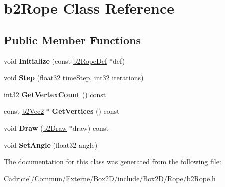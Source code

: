 \hypertarget{classb2_rope}{}\section{b2\+Rope Class Reference}
\label{classb2_rope}
\subsection*{Public Member Functions}
\begin{DoxyCompactItemize}
\item 
void {\bfseries Initialize} (const \hyperlink{structb2_rope_def}{b2\+Rope\+Def} $\ast$def)\hypertarget{classb2_rope_a2a672ca3310790f4af1beb123e597d70}{}\label{classb2_rope_a2a672ca3310790f4af1beb123e597d70}

\item 
void {\bfseries Step} (float32 time\+Step, int32 iterations)\hypertarget{classb2_rope_abe9ce398cef717b136645cbc37f38d70}{}\label{classb2_rope_abe9ce398cef717b136645cbc37f38d70}

\item 
int32 {\bfseries Get\+Vertex\+Count} () const \hypertarget{classb2_rope_aa002b5f7efd152770803aade884f2c75}{}\label{classb2_rope_aa002b5f7efd152770803aade884f2c75}

\item 
const \hyperlink{structb2_vec2}{b2\+Vec2} $\ast$ {\bfseries Get\+Vertices} () const \hypertarget{classb2_rope_a9f5c76a25e44baa702d2a6beef9f2f9c}{}\label{classb2_rope_a9f5c76a25e44baa702d2a6beef9f2f9c}

\item 
void {\bfseries Draw} (\hyperlink{classb2_draw}{b2\+Draw} $\ast$draw) const \hypertarget{classb2_rope_acefc7b4d53ba675fc08700f39d121ec3}{}\label{classb2_rope_acefc7b4d53ba675fc08700f39d121ec3}

\item 
void {\bfseries Set\+Angle} (float32 angle)\hypertarget{classb2_rope_a8a1717a5e0b2c54d56fe438c8cae43b7}{}\label{classb2_rope_a8a1717a5e0b2c54d56fe438c8cae43b7}

\end{DoxyCompactItemize}


The documentation for this class was generated from the following file\+:\begin{DoxyCompactItemize}
\item 
Cadriciel/\+Commun/\+Externe/\+Box2\+D/include/\+Box2\+D/\+Rope/b2\+Rope.\+h\end{DoxyCompactItemize}
